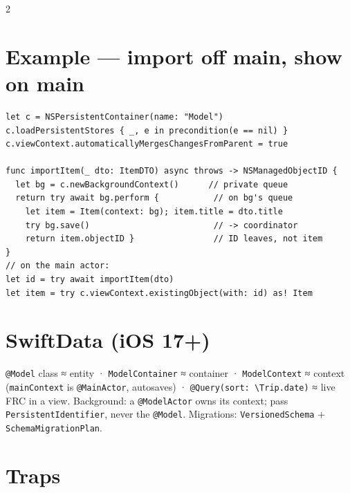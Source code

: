 \documentclass[8pt]{extarticle}
\begin{document}
\begin{multicols}{2}
\columnbreak

\section{Example — import off main, show on main}
\begin{lstlisting}[language=SwiftSheet]
let c = NSPersistentContainer(name: "Model")
c.loadPersistentStores { _, e in precondition(e == nil) }
c.viewContext.automaticallyMergesChangesFromParent = true

func importItem(_ dto: ItemDTO) async throws -> NSManagedObjectID {
  let bg = c.newBackgroundContext()      // private queue
  return try await bg.perform {           // on bg's queue
    let item = Item(context: bg); item.title = dto.title
    try bg.save()                         // -> coordinator
    return item.objectID }                // ID leaves, not item
}
// on the main actor:
let id = try await importItem(dto)
let item = try c.viewContext.existingObject(with: id) as! Item
\end{lstlisting}

\section{SwiftData (iOS 17+)}
\texttt{@Model} class ≈ entity · \texttt{ModelContainer} ≈ container ·
\texttt{ModelContext} ≈ context (\texttt{mainContext} is \texttt{@MainActor}, autosaves) ·
\texttt{@Query(sort: \textbackslash Trip.date)} ≈ live FRC in a view. Background: a
\texttt{@ModelActor} owns its context; pass \texttt{PersistentIdentifier}, never the
\texttt{@Model}. Migrations: \texttt{VersionedSchema} + \texttt{SchemaMigrationPlan}.

\section{Traps}
\begin{itemize}
\end{itemize}


\end{multicols}
\end{document}
